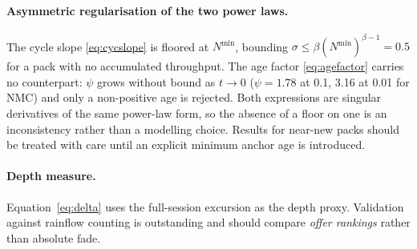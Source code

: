 \documentclass[11pt,a4paper]{article}
\begin{document}
\paragraph{Asymmetric regularisation of the two power laws.}
The cycle slope \eqref{eq:cycslope} is floored at $N^{\min}$, bounding
$\sigma \le \beta (N^{\min})^{\beta-1} = \num{0.5}$ for a pack with no
accumulated throughput. The age factor \eqref{eq:agefactor} carries no
counterpart: $\psi$ grows without bound as $t \to 0$
($\psi = \num{1.78}$ at \SI{0.1}{\yr}, \num{3.16} at \SI{0.01}{\yr} for
NMC) and only a non-positive age is rejected. Both expressions are
singular derivatives of the same power-law form, so the absence of a
floor on one is an inconsistency rather than a modelling choice. Results
for near-new packs should be treated with care until an explicit minimum
anchor age is introduced.

\paragraph{Depth measure.}
Equation~\eqref{eq:delta} uses the full-session excursion as the depth
proxy. Validation against rainflow counting is outstanding and should
compare \emph{offer rankings} rather than absolute fade.
\end{document}
